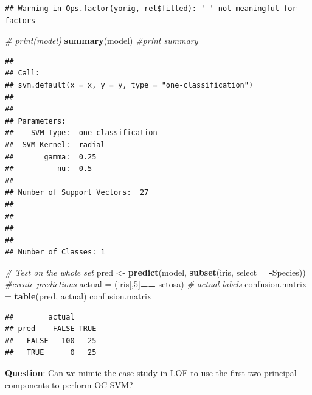\documentclass[
]{book}
\newenvironment{Shaded}{\begin{snugshade}}{\end{snugshade}}
\newcommand{\AttributeTok}[1]{\textcolor[rgb]{0.13,0.29,0.53}{#1}}
\newcommand{\CommentTok}[1]{\textcolor[rgb]{0.56,0.35,0.01}{\textit{#1}}}
\newcommand{\DecValTok}[1]{\textcolor[rgb]{0.00,0.00,0.81}{#1}}
\newcommand{\DocumentationTok}[1]{\textcolor[rgb]{0.56,0.35,0.01}{\textbf{\textit{#1}}}}
\newcommand{\FunctionTok}[1]{\textcolor[rgb]{0.13,0.29,0.53}{\textbf{#1}}}
\newcommand{\NormalTok}[1]{#1}
\newcommand{\OtherTok}[1]{\textcolor[rgb]{0.56,0.35,0.01}{#1}}
\newcommand{\SpecialCharTok}[1]{\textcolor[rgb]{0.81,0.36,0.00}{\textbf{#1}}}
\newcommand{\StringTok}[1]{\textcolor[rgb]{0.31,0.60,0.02}{#1}}
\begin{document}
\begin{Shaded}
\end{Shaded}

\begin{verbatim}
## Warning in Ops.factor(yorig, ret$fitted): '-' not meaningful for factors
\end{verbatim}

\begin{Shaded}
\begin{Highlighting}[]
\CommentTok{\# print(model)}
\FunctionTok{summary}\NormalTok{(model) }\CommentTok{\#print summary}
\end{Highlighting}
\end{Shaded}

\begin{verbatim}
## 
## Call:
## svm.default(x = x, y = y, type = "one-classification")
## 
## 
## Parameters:
##    SVM-Type:  one-classification 
##  SVM-Kernel:  radial 
##       gamma:  0.25 
##          nu:  0.5 
## 
## Number of Support Vectors:  27
## 
## 
## 
## 
## Number of Classes: 1
\end{verbatim}

\begin{Shaded}
\begin{Highlighting}[]
\CommentTok{\# Test on the whole set}
\NormalTok{pred }\OtherTok{\textless{}{-}} \FunctionTok{predict}\NormalTok{(model, }\FunctionTok{subset}\NormalTok{(iris, }\AttributeTok{select =} \SpecialCharTok{{-}}\NormalTok{Species)) }\CommentTok{\#create predictions}
\NormalTok{actual }\OtherTok{=}\NormalTok{ (iris[,}\DecValTok{5}\NormalTok{]}\SpecialCharTok{==} \StringTok{\textquotesingle{}setosa\textquotesingle{}}\NormalTok{)   }\CommentTok{\# actual labels}
\NormalTok{confusion.matrix }\OtherTok{=} \FunctionTok{table}\NormalTok{(pred, actual)}
\NormalTok{confusion.matrix}
\end{Highlighting}
\end{Shaded}

\begin{verbatim}
##        actual
## pred    FALSE TRUE
##   FALSE   100   25
##   TRUE      0   25
\end{verbatim}

\textbf{Question}: Can we mimic the case study in LOF to use the first two principal components to perform OC-SVM?

  
\end{document}
